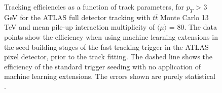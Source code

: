 \begin{figure}[htbp!] 
    \centering
    \hfill%
    \caption{Tracking efficiencies as a function of track parameters, for $p_{T}$ > 3 GeV for the ATLAS full detector tracking with $t\overline{t}$ Monte Carlo 13 TeV and mean pile-up interaction multiplicity of $\langle \mu \rangle$ = 80. The data points show the efficiency when using machine learning extensions in the seed building stages of the fast tracking trigger in the ATLAS pixel detector, prior to the track fitting. The dashed line shows the efficiency of the standard trigger seeding with no application of machine learning extensions. The errors shown are purely statistical \cite{public-hlt}.}
    \label{fig:efficiencies-ml-hit-pair-predictor}
\end{figure}




